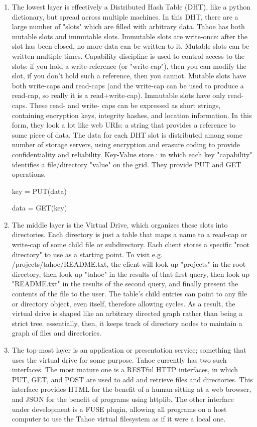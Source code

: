\documentclass[11pt]{article}
\begin{document}
\begin{enumerate}
\item The lowest layer is effectively a Distributed Hash Table (DHT), 
like a python dictionary, but spread across multiple machines. In this 
DHT, there are a large number of "slots" which are filled with arbitrary 
data. Tahoe has both mutable slots and immutable slots. Immutable slots 
are write-once: after the slot has been closed, no more data can be written 
to it. Mutable slots can be written multiple times. Capability discipline 
is used to control access to the slots: if you hold a write-reference 
(or "write-cap"), then you can modify the slot, if you don't hold such a 
reference, then you cannot. Mutable slots have both write-caps and 
read-caps (and the write-cap can be used to produce a read-cap, so really 
it is a read+write-cap). Immutable slots have only read-caps. These read- 
and write- caps can be expressed as short strings, containing encryption 
keys, integrity hashes, and location information. In this form, they look 
a lot like web URIs: a string that provides a reference to some piece of 
data. The data for each DHT slot is distributed among some number of 
storage servers, using encryption and erasure coding to provide 
confidentiality and reliability. Key-Value store : in which each key 
"capability" identifies a file/directory "value" on the grid. They provide 
PUT and GET operations. 

\subitem key = PUT(data) 

\subitem data = GET(key)

\item The middle layer is the Virtual Drive, which organizes these slots 
into directories. Each directory is just a table that maps a name to a 
read-cap or write-cap of some child file or subdirectory. Each client 
stores a specific "root directory" to use as a starting point. To visit 
e.g. /projects/tahoe/README.txt, the client will look up "projects" in 
the root directory, then look up "tahoe" in the results of that first 
query, then look up "README.txt" in the results of the second query, and 
finally present the contents of the file to the user. The table's child 
entries can point to any file or directory object, even itself, therefore 
allowing cycles. As a result, the virtual drive is shaped like an arbitrary 
directed graph rather than being a strict tree. essentially, then, it keeps  
track of directory nodes to maintain a graph of files and directories. 

\item The top-most layer is an application or presentation service; 
something that uses the virtual drive for some purpose. Tahoe currently 
has two such interfaces. The most mature one is a RESTful HTTP interfaces, 
in which PUT, GET, and POST are used to add and retrieve files and 
directories. This interface provides HTML for the benefit of a human sitting 
at a web browser, and JSON for the benefit of programs using httplib. The 
other interface under development is a FUSE plugin, allowing all programs 
on a host computer to use the Tahoe virtual filesystem as if it were a local 
one. 

\end{enumerate}
\end{document}
